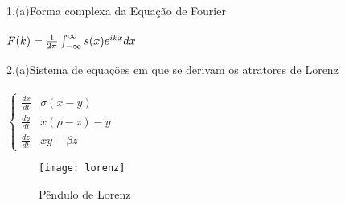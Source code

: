 \documentclass[		
oneside,		
a4paper,						
12pt,
brazil]{article}
\begin{document}
		
	1.(a)Forma complexa da Equação de Fourier
	\\
	\\
\begin{math}
	$$
	F(k)=\frac{1}{2\pi}\int_{-\infty}^{\infty}{s(x)e^{ikx}dx}
	$$
	\\
	\\
\end{math}

	2.(a)Sistema de equações em que se derivam os atratores de Lorenz
	\\
	\\
\begin{math}
	\left\{ \begin{array}{ll}
	\frac{dx}{dt} & \textrm{$\sigma (x-y)$}\\
	\frac{dy}{dt} & \textrm{$x(\rho -z)-y$}\\
	\frac{dz}{dt} & \textrm{$xy-\beta z$}
	\end{array} \right.
\end{math}

\begin{figure}[h]
	\centering
	\texttt{[image: lorenz]}
	\caption{Pêndulo de Lorenz}
\end{figure}
	
	
\end{document}
